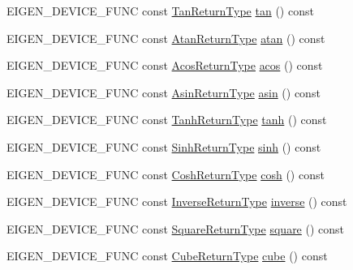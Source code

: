 \begin{DoxyCompactItemize}
\item 
E\+I\+G\+E\+N\+\_\+\+D\+E\+V\+I\+C\+E\+\_\+\+F\+U\+NC const \mbox{\hyperlink{class_eigen_1_1_cwise_unary_op}{Tan\+Return\+Type}} \mbox{\hyperlink{class_eigen_1_1_array_base_acc502922cf9aeb43b07b30f250cd1d21}{tan}} () const
\item 
E\+I\+G\+E\+N\+\_\+\+D\+E\+V\+I\+C\+E\+\_\+\+F\+U\+NC const \mbox{\hyperlink{class_eigen_1_1_cwise_unary_op}{Atan\+Return\+Type}} \mbox{\hyperlink{class_eigen_1_1_array_base_a3d7c83346563ef1abac3c75615959595}{atan}} () const
\item 
E\+I\+G\+E\+N\+\_\+\+D\+E\+V\+I\+C\+E\+\_\+\+F\+U\+NC const \mbox{\hyperlink{class_eigen_1_1_cwise_unary_op}{Acos\+Return\+Type}} \mbox{\hyperlink{class_eigen_1_1_array_base_a823b8a01037260c26ea853f41a75dd87}{acos}} () const
\item 
E\+I\+G\+E\+N\+\_\+\+D\+E\+V\+I\+C\+E\+\_\+\+F\+U\+NC const \mbox{\hyperlink{class_eigen_1_1_cwise_unary_op}{Asin\+Return\+Type}} \mbox{\hyperlink{class_eigen_1_1_array_base_a6d090b549b70fcb9468d16341c2204f2}{asin}} () const
\item 
E\+I\+G\+E\+N\+\_\+\+D\+E\+V\+I\+C\+E\+\_\+\+F\+U\+NC const \mbox{\hyperlink{class_eigen_1_1_cwise_unary_op}{Tanh\+Return\+Type}} \mbox{\hyperlink{class_eigen_1_1_array_base_a1e63179878d5a652fef566a67f5b4014}{tanh}} () const
\item 
E\+I\+G\+E\+N\+\_\+\+D\+E\+V\+I\+C\+E\+\_\+\+F\+U\+NC const \mbox{\hyperlink{class_eigen_1_1_cwise_unary_op}{Sinh\+Return\+Type}} \mbox{\hyperlink{class_eigen_1_1_array_base_a0984c5e3b76efa0c66a754ea7106f5b9}{sinh}} () const
\item 
E\+I\+G\+E\+N\+\_\+\+D\+E\+V\+I\+C\+E\+\_\+\+F\+U\+NC const \mbox{\hyperlink{class_eigen_1_1_cwise_unary_op}{Cosh\+Return\+Type}} \mbox{\hyperlink{class_eigen_1_1_array_base_a5fd3dbcabcd2857db8f26ca5b321788f}{cosh}} () const
\item 
E\+I\+G\+E\+N\+\_\+\+D\+E\+V\+I\+C\+E\+\_\+\+F\+U\+NC const \mbox{\hyperlink{class_eigen_1_1_cwise_unary_op}{Inverse\+Return\+Type}} \mbox{\hyperlink{class_eigen_1_1_array_base_a6b2a84065ff875d9491cf8d84ddbee2f}{inverse}} () const
\item 
E\+I\+G\+E\+N\+\_\+\+D\+E\+V\+I\+C\+E\+\_\+\+F\+U\+NC const \mbox{\hyperlink{class_eigen_1_1_cwise_unary_op}{Square\+Return\+Type}} \mbox{\hyperlink{class_eigen_1_1_array_base_a95c818b933d73944c53bf0226ea106c8}{square}} () const
\item 
E\+I\+G\+E\+N\+\_\+\+D\+E\+V\+I\+C\+E\+\_\+\+F\+U\+NC const \mbox{\hyperlink{class_eigen_1_1_cwise_unary_op}{Cube\+Return\+Type}} \mbox{\hyperlink{class_eigen_1_1_array_base_ab49fda99c455624b18410b9af0be71ec}{cube}} () const

\end{DoxyCompactItemize}
